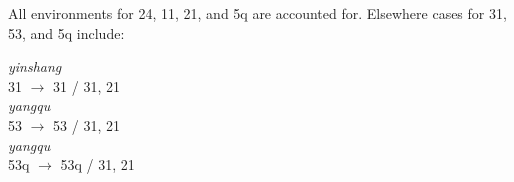\documentclass{article}
\begin{document}
All environments for 24, 11, 21, and 5q are accounted for. Elsewhere cases for 31, 53, and 5q include:
\begin{exe}
\ex 
\begin{xlist}
\ex \textit{yinshang} \\
31 $\rightarrow$ 31 / \underline{\hspace{1em}} 31, 21 \\
\ex \textit{yangqu} \\
53 $\rightarrow$ 53 / \underline{\hspace{1em}} 31, 21 \\
\ex \textit{yangqu} \\
53q $\rightarrow$ 53q / \underline{\hspace{1em}} 31, 21 \\
\end{xlist}
\end{exe}
\end{document}
